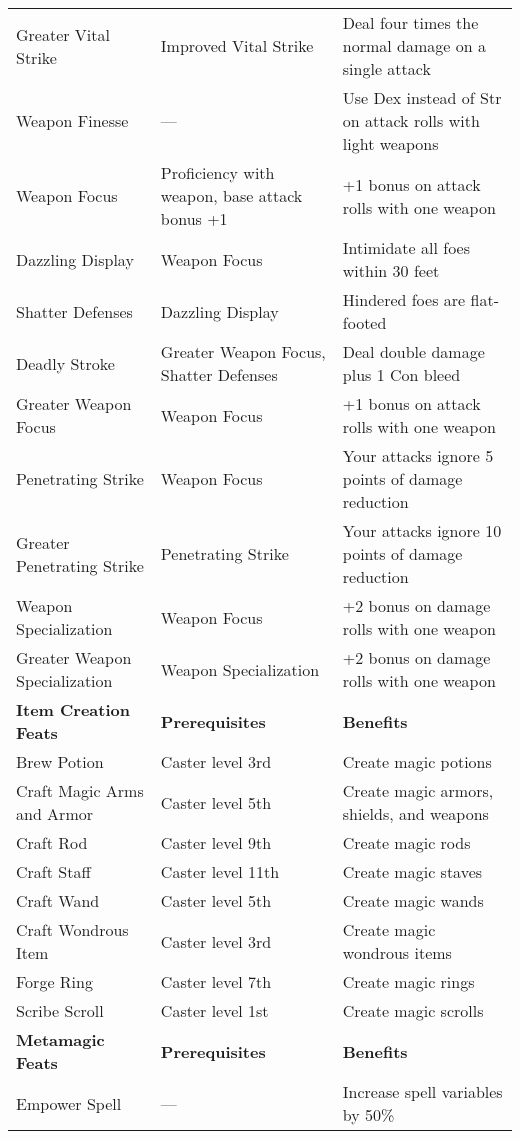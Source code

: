 \begin{table*}[]
\begin{tabularx}{\linewidth}{lXl}
\quad \quad Greater Vital Strike & Improved Vital Strike & Deal four times the normal damage on a single attack\\
Weapon Finesse & --- & Use Dex instead of Str on attack rolls with light weapons\\
Weapon Focus & Proficiency with weapon, base attack bonus +1 & +1 bonus on attack rolls with one weapon\\
\quad Dazzling Display & Weapon Focus & Intimidate all foes within 30 feet\\
\quad \quad Shatter Defenses & Dazzling Display & Hindered foes are flat-footed \\
\quad \quad \quad Deadly Stroke & Greater Weapon Focus, Shatter Defenses & Deal double damage plus 1 Con bleed \\
\quad Greater Weapon Focus & Weapon Focus & +1 bonus on attack rolls with one weapon\\
\quad Penetrating Strike & Weapon Focus & Your attacks ignore 5 points of damage reduction\\
\quad \quad Greater Penetrating Strike & Penetrating Strike & Your attacks ignore 10 points of damage reduction\\
\quad Weapon Specialization & Weapon Focus & +2 bonus on damage rolls with one weapon\\
\quad \quad Greater Weapon Specialization & Weapon Specialization & +2 bonus on damage rolls with one weapon\\
\textbf{Item Creation Feats} & \textbf{Prerequisites} & \textbf{Benefits}\\
Brew Potion & Caster level 3rd & Create magic potions\\
Craft Magic Arms and Armor & Caster level 5th & Create magic armors, shields, and weapons\\
Craft Rod & Caster level 9th & Create magic rods\\
Craft Staff & Caster level 11th & Create magic staves\\
Craft Wand & Caster level 5th & Create magic wands\\
Craft Wondrous Item & Caster level 3rd & Create magic wondrous items\\
Forge Ring & Caster level 7th & Create magic rings\\
Scribe Scroll & Caster level 1st & Create magic scrolls\\
\textbf{Metamagic Feats} & \textbf{Prerequisites} & \textbf{Benefits}\\
Empower Spell & --- & Increase spell variables by 50\%\\

\end{tabularx}
\end{table*}
